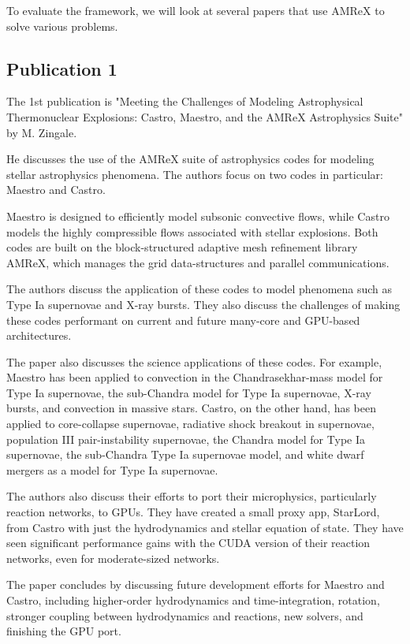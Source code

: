 \documentclass[12pt, a4paper]{scrartcl}
\begin{document}
To evaluate the framework, we will look at several papers that use AMReX to solve various problems.

\subsection{Publication 1}

The 1st publication is "Meeting the Challenges of Modeling Astrophysical Thermonuclear Explosions: 
Castro, Maestro, and the AMReX Astrophysics Suite" by M. Zingale.

He discusses the use of the AMReX suite of astrophysics codes for modeling stellar astrophysics phenomena. 
The authors focus on two codes in particular: Maestro and Castro.

Maestro is designed to efficiently model subsonic convective flows, while Castro models the highly 
compressible flows associated with stellar explosions. Both codes are built on the block-structured 
adaptive mesh refinement library AMReX, which manages the grid data-structures and parallel communications.

The authors discuss the application of these codes to model phenomena such as Type Ia supernovae and X-ray bursts.
They also discuss the challenges of making these codes performant on current and future many-core and GPU-based architectures.

The paper also discusses the science applications of these codes. For example, Maestro has been applied to 
convection in the Chandrasekhar-mass model for Type Ia supernovae, the sub-Chandra model for Type Ia 
supernovae, X-ray bursts, and convection in massive stars. Castro, on the other hand, has been applied to 
core-collapse supernovae, radiative shock breakout in supernovae, population III pair-instability 
supernovae, the Chandra model for Type Ia supernovae, the sub-Chandra Type Ia supernovae model, and white 
dwarf mergers as a model for Type Ia supernovae.

The authors also discuss their efforts to port their microphysics, particularly reaction networks, to GPUs. 
They have created a small proxy app, StarLord, from Castro with just the hydrodynamics and stellar equation 
of state. They have seen significant performance gains with the CUDA version of their reaction networks, even 
for moderate-sized networks.

The paper concludes by discussing future development efforts for Maestro and Castro, including higher-order 
hydrodynamics and time-integration, rotation, stronger coupling between hydrodynamics and reactions, new solvers, 
and finishing the GPU port.
\end{document}
